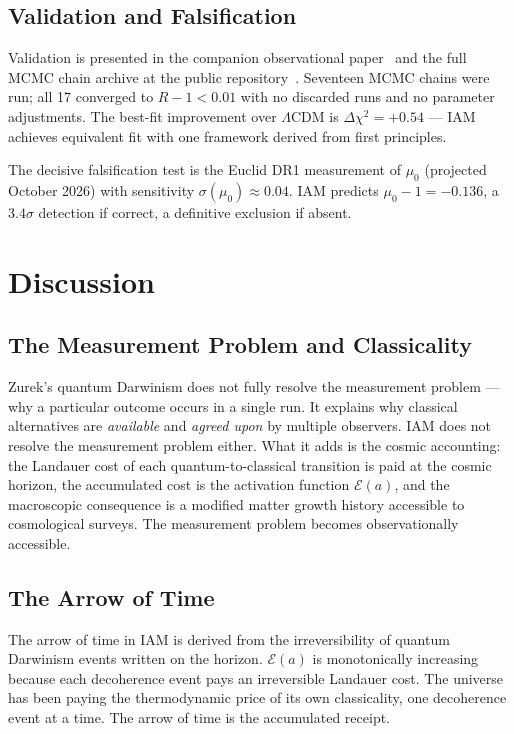 \documentclass[12pt,a4paper]{article}
\begin{document}
\subsection{Validation and Falsification}

Validation is presented in the companion observational paper~\citep{IAM_obs}
and the full MCMC chain archive at the public
repository~\citep{IAM_repo}. Seventeen MCMC chains were run; all 17
converged to $R-1 < 0.01$ with no discarded runs and no parameter
adjustments. The best-fit improvement over $\Lambda$CDM is $\Delta\chi^2 =
+0.54$ --- IAM achieves equivalent fit with one framework derived from first
principles.

The decisive falsification test is the Euclid DR1 measurement of $\mu_0$
(projected October 2026) with sensitivity $\sigma(\mu_0) \approx 0.04$.
IAM predicts $\mu_0 - 1 = -0.136$, a $3.4\sigma$ detection if correct,
a definitive exclusion if absent.

\section{Discussion}
\label{sec:discussion}

\subsection{The Measurement Problem and Classicality}

Zurek's quantum Darwinism does not fully resolve the measurement problem ---
why a particular outcome occurs in a single run. It explains why classical
alternatives are \emph{available} and \emph{agreed upon} by multiple
observers. IAM does not resolve the measurement problem either. What it adds
is the cosmic accounting: the Landauer cost of each quantum-to-classical
transition is paid at the cosmic horizon, the accumulated cost is the
activation function $\mathcal{E}(a)$, and the macroscopic consequence is
a modified matter growth history accessible to cosmological surveys. The
measurement problem becomes observationally accessible.

\subsection{The Arrow of Time}

The arrow of time in IAM is derived from the irreversibility of quantum
Darwinism events written on the horizon. $\mathcal{E}(a)$ is monotonically
increasing because each decoherence event pays an irreversible Landauer cost.
The universe has been paying the thermodynamic price of its own classicality,
one decoherence event at a time. The arrow of time is the accumulated receipt.
\end{document}
